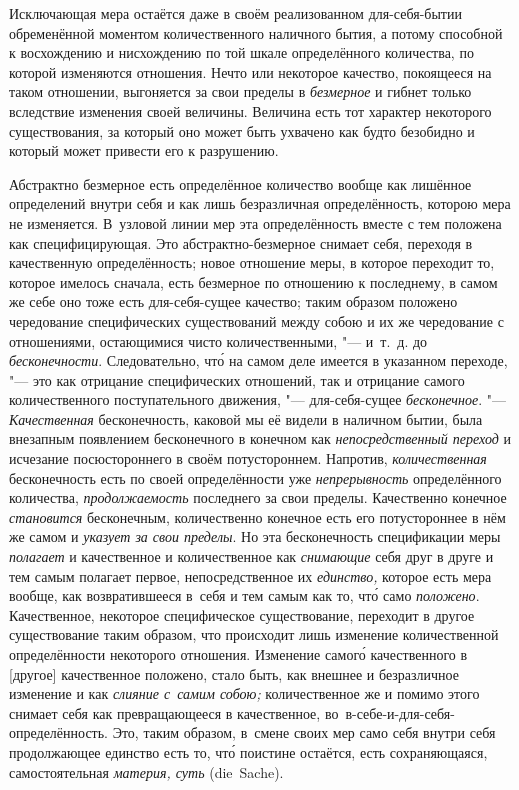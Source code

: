 
Исключающая мера остаётся даже в своём реализованном для-себя-бытии
обременённой моментом количественного наличного бытия, а потому способной к
восхождению и нисхождению по той шкале определённого количества, по которой
изменяются отношения. Нечто или некоторое качество, покоящееся на таком
отношении, выгоняется за свои пределы в {\em безмерное} и гибнет только
вследствие изменения своей величины. Величина есть тот характер некоторого
существования, за который оно может быть ухвачено как будто безобидно и который
может привести его к разрушению.

Абстрактно безмерное есть определённое количество вообще как лишённое
определений внутри себя и как лишь безразличная определённость, которою мера не
изменяется. В~узловой линии мер эта определённость вместе с тем положена как
специфицирующая. Это абстрактно-безмерное снимает себя, переходя в качественную
определённость; новое отношение меры, в которое переходит то, которое имелось
сначала, есть безмерное по отношению к последнему, в самом же себе оно тоже
есть для-себя-сущее качество; таким образом положено чередование специфических
существований между собою и их же чередование с отношениями, остающимися чисто
количественными, "--- и~т.~д. до {\em бесконечности}. Следовательно, чт\'{о} на
самом деле имеется в указанном переходе, "--- это как отрицание специфических
отношений, так и отрицание самого количественного поступательного движения,
"--- для-себя-сущее {\em бесконечное}. "--- {\em Качественная} бесконечность,
каковой мы её видели в наличном бытии, была внезапным появлением бесконечного в
конечном как {\em непосредственный переход} и исчезание посюстороннего в своём
потустороннем. Напротив, {\em количественная} бесконечность есть по своей
определённости уже {\em непрерывность} определённого количества,
{\em продолжаемость} последнего за свои пределы. Качественно конечное
{\em становится} бесконечным, количественно конечное есть его потустороннее в
нём же самом и {\em указует за свои пределы}. Но эта бесконечность спецификации
меры {\em полагает} и качественное и количественное как {\em снимающие} себя
друг в друге и тем самым полагает первое, непосредственное их {\em единство,}
которое есть мера вообще, как возвратившееся в~себя и тем самым как то, чт\'{о}
само {\em положено}. Качественное, некоторое специфическое существование,
переходит в другое существование таким образом, что происходит лишь изменение
количественной определённости некоторого отношения. Изменение самог\'{о}
качественного в [другое] качественное положено, стало быть, как внешнее и
безразличное изменение и как {\em слияние с~самим собою;} количественное же и
помимо этого снимает себя как превращающееся в качественное,
во~в-себе-и-для-себя-определённость. Это, таким образом, в~смене своих мер само
себя внутри себя продолжающее единство есть то, чт\'{о} поистине остаётся, есть
сохраняющаяся, самостоятельная {\em материя, суть} (die~Sache).

